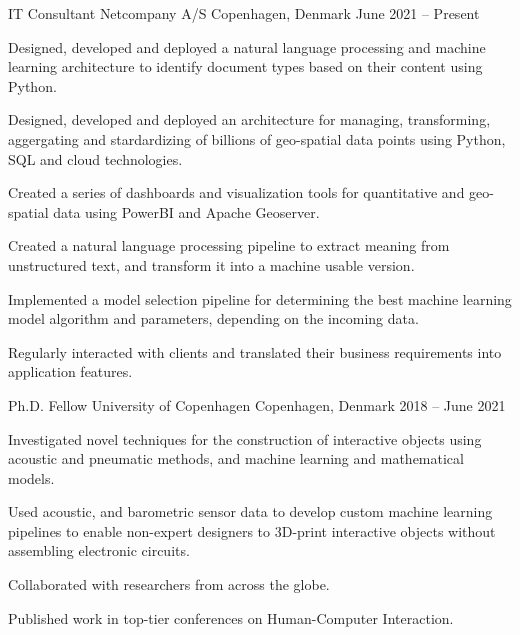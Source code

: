 

\begin{cventries}
  \cventry
    {IT Consultant}
    {Netcompany A/S}
    {Copenhagen, Denmark}
    {June 2021 -- Present}
    {
      \begin{cvitems}
        \item Designed, developed and deployed a natural language processing and
        machine learning architecture to identify document types based on their
        content using Python.
        \item Designed, developed and deployed an architecture for managing,
        transforming, aggergating and stardardizing of billions of geo-spatial
        data points using Python, SQL and cloud technologies.
        \item Created a series of dashboards and visualization tools for
        quantitative and geo-spatial data using PowerBI and Apache Geoserver.
        \item Created a natural language processing pipeline to extract meaning
        from unstructured text, and transform it into a machine usable version.
        \item Implemented a model selection pipeline for determining the best
        machine learning model algorithm and parameters, depending on the
        incoming data.
        \item Regularly interacted with clients and translated their business
        requirements into application features.
      \end{cvitems}
      \vspace{1em}
    }
    
  \cventry
    {Ph.D. Fellow}
    {University of Copenhagen}
    {Copenhagen, Denmark}
    {2018 -- June 2021}
    {
      \begin{cvitems}
        \item Investigated novel techniques for the construction of
          interactive objects using acoustic and pneumatic methods, and machine
          learning and mathematical models.
        \item Used acoustic, and barometric sensor data to develop custom
          machine learning pipelines to enable non-expert designers to 3D-print
          interactive objects without assembling electronic circuits.
        \item Collaborated with researchers from across the globe.
        \item Published work in top-tier conferences on Human-Computer
          Interaction.
      \end{cvitems}
      \vspace{1em}
    }


\end{cventries}
